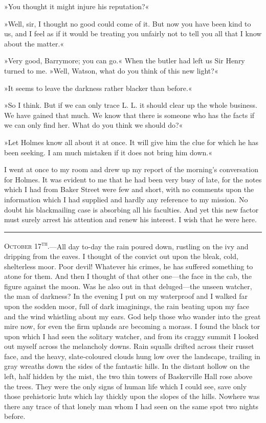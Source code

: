 »You thought it might injure his reputation?«

»Well, sir, I thought no good could come of it. But now you have been kind to us, and I feel as if it would be treating you unfairly not to tell you all that I know about the matter.«

»Very good, Barrymore; you can go.« When the butler had left us Sir Henry turned to me. »Well, Watson, what do you think of this new light?«

»It seems to leave the darkness rather blacker than before.«

»So I think. But if we can only trace L. L. it should clear up the whole business. We have gained that much. We know that there is someone who has the facts if we can only find her. What do you think we should do?«

»Let Holmes know all about it at once. It will give him the clue for which he has been seeking. I am much mistaken if it does not bring him down.«

I went at once to my room and drew up my report of the morning's conversation for Holmes. It was evident to me that he had been very busy of late, for the notes which I had from Baker Street were few and short, with no comments upon the information which I had supplied and hardly any reference to my mission. No doubt his blackmailing case is absorbing all his faculties. And yet this new factor must surely arrest his attention and renew his interest. I wish that he were here.

\noindent\hfil\rule{0.5\textwidth}{.4pt}\hfil 

\textsc{October 17\textsuperscript{th}.}—All day to-day the rain poured down, rustling on the ivy and dripping from the eaves. I thought of the convict out upon the bleak, cold, shelterless moor. Poor devil! Whatever his crimes, he has suffered something to atone for them. And then I thought of that other one—the face in the cab, the figure against the moon. Was he also out in that deluged—the unseen watcher, the man of darkness? In the evening I put on my waterproof and I walked far upon the sodden moor, full of dark imaginings, the rain beating upon my face and the wind whistling about my ears. God help those who wander into the great mire now, for even the firm uplands are becoming a morass. I found the black tor upon which I had seen the solitary watcher, and from its craggy summit I looked out myself across the melancholy downs. Rain squalls drifted across their russet face, and the heavy, slate-coloured clouds hung low over the landscape, trailing in gray wreaths down the sides of the fantastic hills. In the distant hollow on the left, half hidden by the mist, the two thin towers of Baskerville Hall rose above the trees. They were the only signs of human life which I could see, save only those prehistoric huts which lay thickly upon the slopes of the hills. Nowhere was there any trace of that lonely man whom I had seen on the same spot two nights before.

